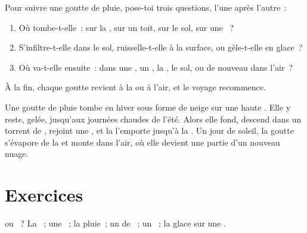 \begin{method}\label{met:g2:water-on-earth:drop}
Pour suivre une goutte de pluie, pose-toi trois questions, l'une après
l'autre~:
\begin{enumerate}
  \item Où tombe-t-elle~: sur la , sur un toit, sur le sol, sur une
        ~?
  \item S'infiltre-t-elle dans le sol, ruisselle-t-elle à la surface, ou
        gèle-t-elle en glace~?
  \item Où va-t-elle ensuite~: dans une , un , la , le sol,
        ou de nouveau dans l'air~?
\end{enumerate}
À la fin, chaque goutte revient à la  ou à l'air, et le voyage
recommence.
\end{method}

\begin{example}\label{ex:g2:water-on-earth:mountain}
Une goutte de pluie tombe en hiver sous forme de neige sur une haute
. Elle y reste, gelée, jusqu'aux journées chaudes de l'été. Alors
elle fond, descend dans un torrent de , rejoint une , et la
 l'emporte jusqu'à la . Un jour de soleil, la goutte s'évapore
de la  et monte dans l'air, où elle devient une partie d'un nouveau
nuage.
\end{example}

\section{Exercices}

\begin{exercise}[$\star$]\label{exo:g2:water-on-earth:1}
 ou ~? La ~; une ~; la pluie~; un  de
~; un ~; la glace sur une .
\end{exercise}

